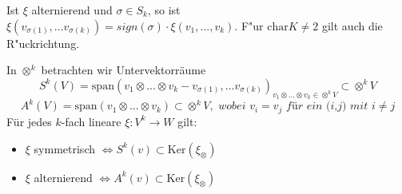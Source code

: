 \documentclass[9pt, a4paper, twocolumn, landscape]{article}
\begin{document}
\begin{remark}
Ist $\xi$ alternierend und $ \sigma  \in S_k$, so ist\\
$
\xi(v_{\sigma(1)},...v_{\sigma(k)}) = \textit{sign}(\sigma) \cdot \xi(v_1,...,v_k).
$
F"ur $\mathrm{char}K \neq 2$ gilt auch die R"uckrichtung.
\end{remark}

\begin{lemma}
In $\otimes^k$ betrachten wir Untervektorräume 
$$ 
S^k(V) = \mathrm{span} (v_1 \otimes... \otimes v_k  - v_{\sigma(1)},...v_{\sigma(k)})_{v_1 \otimes... \otimes v_k \in  \otimes^k V} \subset \otimes^k V
$$
$$ A^k(V) = \mathrm{span} (v_1 \otimes... \otimes v_k) \subset \otimes^k V, \textit{ wobei  } v_i = v_j \textit{ für ein (i,j) mit  } i\neq j 
$$
Für jedes $k$-fach lineare $\xi: V^k \rightarrow W$ gilt:
\begin{itemize}
\item $\xi$ symmetrisch $\Leftrightarrow S^k(v) \subset \mathrm{Ker}(\xi_\otimes)$
\item $\xi$ alternierend $\Leftrightarrow A^k(v) \subset \mathrm{Ker}(\xi_\otimes)$
\end{itemize}

\end{lemma}
\end{document}
